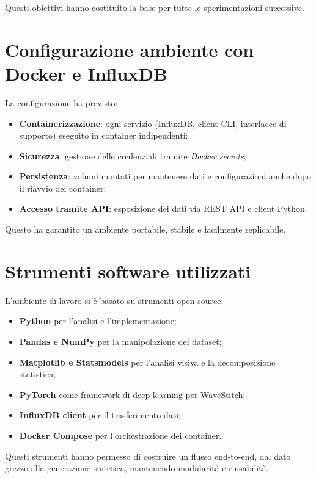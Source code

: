 Questi obiettivi hanno costituito la base per tutte le sperimentazioni successive.

\section{Configurazione ambiente con Docker e InfluxDB}

La configurazione ha previsto:
\begin{itemize}
  \item \textbf{Containerizzazione}: ogni servizio (InfluxDB, client CLI, interfacce di supporto) 
  eseguito in container indipendenti;
  \item \textbf{Sicurezza}: gestione delle credenziali tramite \emph{Docker secrets};
  \item \textbf{Persistenza}: volumi montati per mantenere dati e configurazioni anche dopo 
  il riavvio dei container;
  \item \textbf{Accesso tramite API}: esposizione dei dati via REST API e client Python.
\end{itemize}

Questo ha garantito un ambiente portabile, stabile e facilmente replicabile.

\section{Strumenti software utilizzati}

L’ambiente di lavoro si è basato su strumenti open-source:
\begin{itemize}
  \item \textbf{Python} per l’analisi e l’implementazione;
  \item \textbf{Pandas e NumPy} per la manipolazione dei dataset;
  \item \textbf{Matplotlib e Statsmodels} per l’analisi visiva e la decomposizione statistica;
  \item \textbf{PyTorch} come framework di deep learning per WaveStitch;
  \item \textbf{InfluxDB client} per il trasferimento dati;
  \item \textbf{Docker Compose} per l’orchestrazione dei container.
\end{itemize}

Questi strumenti hanno permesso di costruire un flusso end-to-end, dal dato grezzo 
alla generazione sintetica, mantenendo modularità e riusabilità.